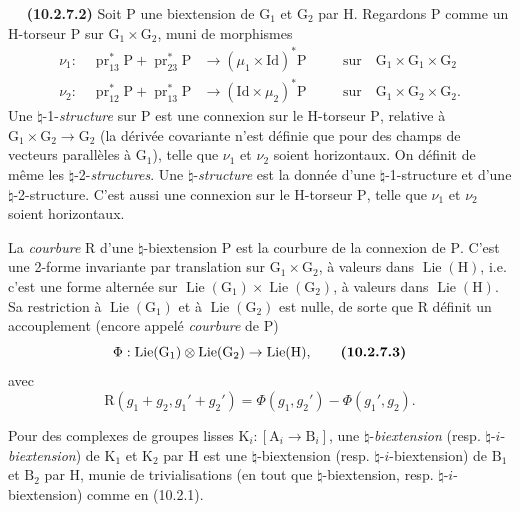 \documentclass[11pt,leqno]{article}
\newcommand{\Page}[1]{\ifvmode\noindent\else\unskip\ \fi{\footnotesize\textcolor{gray}{[p.\,#1]}}\ \ignorespaces}
\begin{document}
\Page{65}
\textbf{(10.2.7.2)} Soit \(\mathrm{P}\) une biextension de
\(\mathrm{G}_1\) et \(\mathrm{G}_2\) par \(\mathrm{H}\).
Regardons \(\mathrm{P}\) comme un \(\mathrm{H}\)-torseur
\(\mathrm{P}\) sur \(\mathrm{G}_1\times\mathrm{G}_2\), muni de
morphismes
\[
\begin{aligned}
\nu_1:\quad
\operatorname{pr}_{13}^{*}\mathrm{P}
+\operatorname{pr}_{23}^{*}\mathrm{P}
&\to(\mu_1\times\mathrm{Id})^{*}\mathrm{P}
&&\quad\text{sur}\quad
\mathrm{G}_1\times\mathrm{G}_1\times\mathrm{G}_2\\
\nu_2:\quad
\operatorname{pr}_{12}^{*}\mathrm{P}
+\operatorname{pr}_{13}^{*}\mathrm{P}
&\to(\mathrm{Id}\times\mu_2)^{*}\mathrm{P}
&&\quad\text{sur}\quad
\mathrm{G}_1\times\mathrm{G}_2\times\mathrm{G}_2.
\end{aligned}
\]
Une \(\natural\)-1-\textit{structure} sur \(\mathrm{P}\) est une
connexion sur le \(\mathrm{H}\)-torseur \(\mathrm{P}\), relative à
\(\mathrm{G}_1\times\mathrm{G}_2\to\mathrm{G}_2\) (la dérivée
covariante n’est définie que pour des champs de vecteurs parallèles
à \(\mathrm{G}_1\)), telle que \(\nu_1\) et \(\nu_2\) soient
horizontaux. On définit de même les
\(\natural\)-2-\textit{structures}. Une
\(\natural\)-\textit{structure} est la donnée d’une
\(\natural\)-1-structure et d’une \(\natural\)-2-structure.
C’est aussi une connexion sur le \(\mathrm{H}\)-torseur
\(\mathrm{P}\), telle que \(\nu_1\) et \(\nu_2\) soient horizontaux.

La \textit{courbure} \(\mathrm{R}\) d’une \(\natural\)-biextension
\(\mathrm{P}\) est la courbure de la connexion de \(\mathrm{P}\).
C’est une 2-forme invariante par translation sur
\(\mathrm{G}_1\times\mathrm{G}_2\), à valeurs dans
\(\operatorname{Lie}(\mathrm{H})\), i.e. c’est une forme alternée
sur
\(\operatorname{Lie}(\mathrm{G}_1)\times
\operatorname{Lie}(\mathrm{G}_2)\), à valeurs dans
\(\operatorname{Lie}(\mathrm{H})\).
Sa restriction à \(\operatorname{Lie}(\mathrm{G}_1)\) et à
\(\operatorname{Lie}(\mathrm{G}_2)\) est nulle, de sorte que
\(\mathrm{R}\) définit un accouplement (encore appelé
\textit{courbure} de \(\mathrm{P}\))
\[
\Phi:\operatorname{Lie}(\mathrm{G}_1)\otimes
\operatorname{Lie}(\mathrm{G}_2)\to\operatorname{Lie}(\mathrm{H}),
\tag*{\textbf{(10.2.7.3)}}
\]
avec
\[
\mathrm{R}(g_1+g_2,g_1'+g_2')
=\Phi(g_1,g_2')-\Phi(g_1',g_2).
\]

Pour des complexes de groupes lisses
\(\mathrm{K}_i:[\mathrm{A}_i\to\mathrm{B}_i]\), une
\(\natural\)-\textit{biextension}
(resp. \(\natural\)-\(i\)-\textit{biextension}) de
\(\mathrm{K}_1\) et \(\mathrm{K}_2\) par \(\mathrm{H}\) est une
\(\natural\)-biextension (resp. \(\natural\)-\(i\)-biextension)
de \(\mathrm{B}_1\) et \(\mathrm{B}_2\) par \(\mathrm{H}\),
munie de trivialisations (en tout que \(\natural\)-biextension,
resp. \(\natural\)-\(i\)-biextension) comme en (10.2.1).
\end{document}
